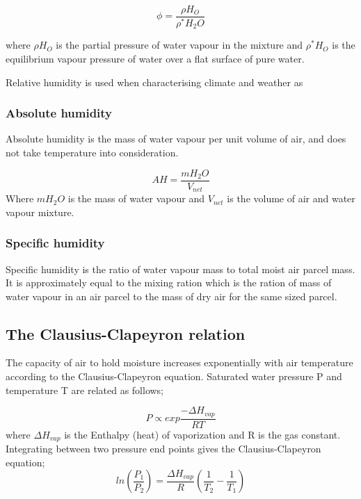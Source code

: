 \documentclass[12pt, oneside]{article}
\begin{document}
\begin{equation}
    \phi = \frac{\rho H_O}{\rho^* H_2O}
\end{equation}

where $\rho H_O$ is the partial pressure of water vapour in the mixture and $\rho^* H_O$ is the equilibrium vapour pressure of water over a flat surface of pure water. 

Relative humidity is used when characterising climate and weather as 

\subsubsection{Absolute humidity}
Absolute humidity is the mass of water vapour per unit volume of air, and does not take temperature into consideration.

\begin{equation}
    AH = \frac{mH_2O}{V_{net}}
\end{equation}
Where $mH_2O$ is the mass of water vapour and $V_{net}$ is the volume of air and water vapour mixture. 



\subsubsection{Specific humidity}
Specific humidity is the ratio of water vapour mass to total moist air parcel mass. It is approximately equal to the mixing ration which is the ration of mass of water vapour in an air parcel to the mass of dry air for the same sized parcel. 




\subsection{The Clausius-Clapeyron relation}\label{cc}
The capacity of air to hold moisture increases exponentially with air temperature according to the Clausius-Clapeyron equation. Saturated water pressure P and temperature T are related as follows;

\begin{equation}
    P \propto exp\frac{-\Delta H_{vap}}{RT}
\end{equation}
where $\Delta H_{vap}$  is the Enthalpy (heat) of vaporization and R is the gas constant. Integrating between two pressure end points gives the Clausius-Clapeyron equation;  
\begin{equation}
    ln \left ( \frac{P_1}{P_2} \right ) = \frac{\Delta H_{vap}}{R} \left ( \frac{1}{T_2} - \frac{1}{T_1} \right )
\end{equation}
\end{document}
